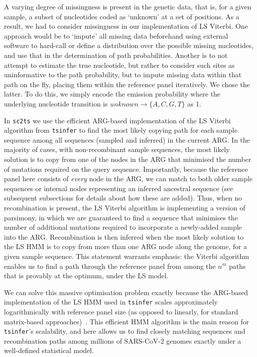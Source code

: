 \documentclass{article}
\begin{document}
A varying degree of missingness is present in the genetic data, that is, for a given sample,
a subset of nucleotides coded as `unknown' at a set of positions. As a result, we had to
consider missingness in our implementation of LS Viterbi. One approach would be to `impute'
all missing data beforehand using external software to hard-call or define a
distribution over the possible missing nucleotides, and use that in the determination of path
probabilities. Another is to not attempt to estimate the true nucleotide, but rather to
consider such sites as uninformative to the path probability, but to impute missing data
within that path on the fly, placing them within the reference panel iteratively. We chose the latter. To do this, we simply encode the emission
probability where the underlying nucleotide transition is $\mathit{unknown}\rightarrow \{A,C,G,T\}$ as 1.

In \texttt{sc2ts} we use the efficient ARG-based implementation of the
LS Viterbi algorithm from \texttt{tsinfer} \citep{Kelleher2019-ba} to find
the most likely copying path for each sample sequence
among all sequences (sampled and inferred) in the current ARG.
In the majority of cases, with non-recombinant sample sequences,
the most likely solution is to copy from one
of the nodes in the ARG that minimised the number of mutations required
on the query sequence. Importantly, because the reference panel here consists of
\emph{every} node in the ARG, we can match to both older sample
sequences or internal nodes representing an inferred ancestral sequence
(see subsequent subsections for details about how these are added).
Thus, when no recombination is present, the LS Viterbi algorithm is
implementing a version of parsimony, in which we are guaranteed to
find a sequence that minimises the number of additional mutations required
to incorporate a newly-added sample into the ARG.
Recombination is then inferred when the most likely solution to the LS
HMM is to copy from more than one ARG node along the genome, for a
given sample sequence. This statement warrants emphasis: the Viterbi algorithm enables us to find a path through the reference panel from among the $n^m$ paths that is provably at the optimum, under the LS model.

We can solve this massive optimisation problem exactly because the ARG-based
implementation of the LS HMM used in \texttt{tsinfer} scales approximately
logarithmically with reference panel size (as opposed to linearly,
for standard matrix-based approaches)~\citep{Kelleher2019-ba}.
This efficient HMM algorithm is the main reason for \texttt{tsinfer}'s
scalability, and here allows us to find closely matching
sequences and recombination paths among millions of SARS-CoV-2
genomes exactly under a well-defined statistical model.
\end{document}
